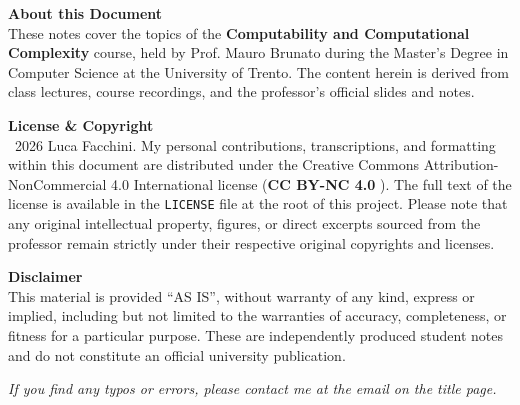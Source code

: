 \clearpage

\newpage
\thispagestyle{empty}
\vspace*{\fill} %

\noindent \textbf{About this Document}\\
These notes cover the topics of the \textbf{Computability and Computational Complexity} course, held by Prof. Mauro Brunato during the Master's Degree in Computer Science at the University of Trento. The content herein is derived from class lectures, course recordings, and the professor's official slides and notes.

\vspace{1em}
\noindent \textbf{License \& Copyright}\\
\textcopyright\ 2026 Luca Facchini. My personal contributions, transcriptions, and formatting within this document are distributed under the Creative Commons Attribution-NonCommercial 4.0 International license (\textbf{CC BY-NC 4.0} \ccbynceu). The full text of the license is available in the \texttt{LICENSE} file at the root of this project. Please note that any original intellectual property, figures, or direct excerpts sourced from the professor remain strictly under their respective original copyrights and licenses.

\vspace{1em}
\noindent \textbf{Disclaimer}\\
This material is provided ``AS IS'', without warranty of any kind, express or implied, including but not limited to the warranties of accuracy, completeness, or fitness for a particular purpose. These are independently produced student notes and do not constitute an official university publication. 

\vspace{1em}
\noindent \textit{If you find any typos or errors, please contact me at the email on the title page.}
\vspace{2cm}
